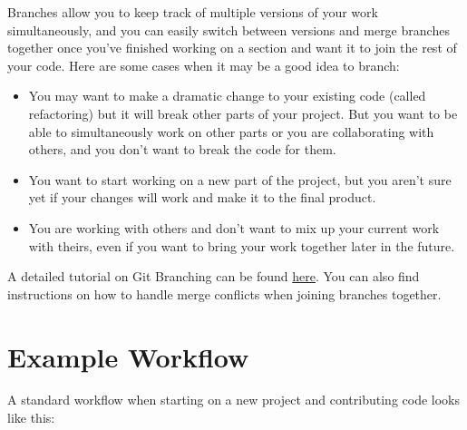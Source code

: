 \documentclass[]{book}
\providecommand{\tightlist}{%
  \setlength{\itemsep}{0pt}\setlength{\parskip}{0pt}}
\begin{document}
Branches allow you to keep track of multiple versions of your work
simultaneously, and you can easily switch between versions and merge
branches together once you've finished working on a section and want it
to join the rest of your code. Here are some cases when it may be a good
idea to branch:

\begin{itemize}
\tightlist
\item
  You may want to make a dramatic change to your existing code (called
  refactoring) but it will break other parts of your project. But you
  want to be able to simultaneously work on other parts or you are
  collaborating with others, and you don't want to break the code for
  them.
\item
  You want to start working on a new part of the project, but you aren't
  sure yet if your changes will work and make it to the final product.
\item
  You are working with others and don't want to mix up your current work
  with theirs, even if you want to bring your work together later in the
  future.
\end{itemize}

A detailed tutorial on Git Branching can be found
\href{https://sp19.datastructur.es/materials/guides/using-git\#e-git-branching-advanced-git-optional}{here}.
You can also find instructions on how to handle merge conflicts when
joining branches together.

\section{Example Workflow}\label{example-workflow}

A standard workflow when starting on a new project and contributing code
looks like this:
\end{document}
